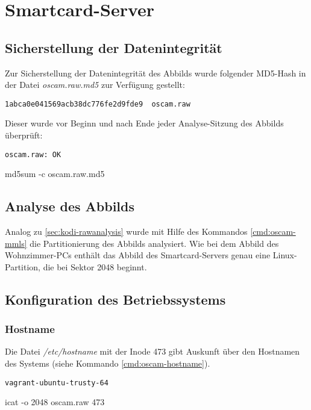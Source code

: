 \section{Smartcard-Server}

\subsection{Sicherstellung der Datenintegrität}

Zur Sicherstellung der Datenintegrität des Abbilds wurde folgender MD5-Hash in der Datei \textit{oscam.raw.md5} zur Verfügung gestellt:

\begin{verbatim}
1abca0e041569acb38dc776fe2d9fde9  oscam.raw
\end{verbatim}

Dieser wurde vor Beginn und nach Ende jeder Analyse-Sitzung des Abbilds überprüft:

\begin{cmd}
\begin{verbatim}
oscam.raw: OK
\end{verbatim}
\caption{md5sum -c oscam.raw.md5}
\end{cmd}

\subsection{Analyse des Abbilds}

Analog zu \autoref{sec:kodi-rawanalysis} wurde mit Hilfe des Kommandos \autoref{cmd:oscam-mmls} die Partitionierung des Abbilds analysiert. Wie bei dem Abbild des Wohnzimmer-PCs enthält das Abbild des Smartcard-Servers genau eine Linux-Partition, die bei Sektor 2048 beginnt.

\subsection{Konfiguration des Betriebssystems}

\subsubsection{Hostname}
\label{sec:oscam-hostname}

Die Datei \textit{/etc/hostname} mit der Inode 473 gibt Auskunft über den Hostnamen des Systems (siehe Kommando \autoref{cmd:oscam-hostname}).

\begin{cmd}
\begin{verbatim}
vagrant-ubuntu-trusty-64
\end{verbatim}
\caption{icat -o 2048 oscam.raw 473}
\label{cmd:oscam-hostname}
\end{cmd}

